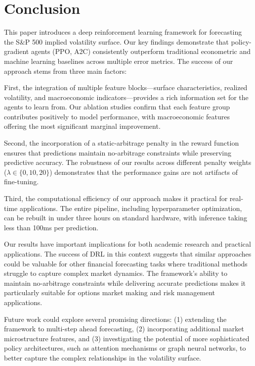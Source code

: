 \documentclass[11pt,a4paper]{article}
\begin{document}
\section{Conclusion}
This paper introduces a deep reinforcement learning framework for forecasting the S\&P 500 implied volatility surface. Our key findings demonstrate that policy-gradient agents (PPO, A2C) consistently outperform traditional econometric and machine learning baselines across multiple error metrics. The success of our approach stems from three main factors:

First, the integration of multiple feature blocks---surface characteristics, realized volatility, and macroeconomic indicators---provides a rich information set for the agents to learn from. Our ablation studies confirm that each feature group contributes positively to model performance, with macroeconomic features offering the most significant marginal improvement.

Second, the incorporation of a static-arbitrage penalty in the reward function ensures that predictions maintain no-arbitrage constraints while preserving predictive accuracy. The robustness of our results across different penalty weights (\(\lambda\in\{0,10,20\}\)) demonstrates that the performance gains are not artifacts of fine-tuning.

Third, the computational efficiency of our approach makes it practical for real-time applications. The entire pipeline, including hyperparameter optimization, can be rebuilt in under three hours on standard hardware, with inference taking less than 100ms per prediction.

Our results have important implications for both academic research and practical applications. The success of DRL in this context suggests that similar approaches could be valuable for other financial forecasting tasks where traditional methods struggle to capture complex market dynamics. The framework's ability to maintain no-arbitrage constraints while delivering accurate predictions makes it particularly suitable for options market making and risk management applications.

Future work could explore several promising directions: (1) extending the framework to multi-step ahead forecasting, (2) incorporating additional market microstructure features, and (3) investigating the potential of more sophisticated policy architectures, such as attention mechanisms or graph neural networks, to better capture the complex relationships in the volatility surface.
\end{document}
